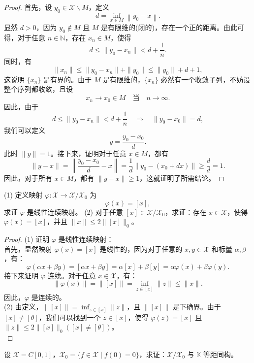 \documentclass[lang=cn,newtx,10pt,scheme=chinese,thmcnt=chapter]{elegantbook}
\begin{document}
\begin{proof}
首先，设 $y_0 \in \mathscr{X} \backslash M$，定义
\[
d =\inf_{x \in M} \left\| y_0 - x \right\|.
\]
显然 $d > 0$，因为 $y_0 \notin M$ 且 $M$ 是有限维的(闭的)，存在一个正的距离。由此可得，对于任意 $n \in \mathbb{N}$，存在 $x_n \in M$，使得
\[
d \leqslant \| y_0 - x_n \| < d + \frac{1}{n}.
\]
同时，有
\[
\| x_n \| \leqslant \| y_0 - x_n \| + \| y_0 \| \leqslant \| y_0 \| + d + 1,
\]
这说明 $\{x_n\}$ 是有界的。由于 $M$ 是有限维的，$\{x_n\}$ 必然有一个收敛子列，不妨设整个序列都收敛，且设
\[
x_n \to x_0 \in M \quad \text{当} \quad n \to \infty.
\]
因此，由于
\[
d \leqslant \| y_0 - x_n \| < d + \frac{1}{n} \quad \Rightarrow \quad \| y_0 - x_0 \| = d,
\]
我们可以定义
\[
y =\frac{y_0 - x_0}{d}.
\]
此时 $\| y \| = 1$。接下来，证明对于任意 $x \in M$，都有
\[
\| y - x \| = \left\| \frac{y_0 - x_0}{d} - x \right\| = \frac{1}{d} \| y_0 - (x_0 + d x) \| \geqslant \frac{d}{d} = 1.
\]
因此，对于所有 $x \in M$，都有 $\| y - x \| \geqslant 1$，这就证明了所需结论。
\end{proof}
\begin{example}
(1) 定义映射 $\varphi: \mathscr{X} \rightarrow \mathscr{X} / \mathscr{X}_0$ 为
\[
\varphi(x) = [x],
\]
求证 $\varphi$ 是线性连续映射。
(2) 对于任意 $[x] \in \mathscr{X} / \mathscr{X}_0$，求证：存在 $x \in \mathscr{X}$，使得 $\varphi(x) = [x]$，并且 $\|x\| \leqslant 2\|[x]\|_0$。
\end{example}

\begin{proof}
(1) 证明 $\varphi$ 是线性连续映射：\\
首先，显然映射 $\varphi(x) = [x]$ 是线性的，因为对于任意的 $x, y \in \mathscr{X}$ 和标量 $\alpha, \beta$，有：
\[
\varphi(\alpha x + \beta y) = [\alpha x + \beta y] = \alpha [x] + \beta [y] = \alpha \varphi(x) + \beta \varphi(y).
\]
接下来证明 $\varphi$ 连续。对于任意 $x \in \mathscr{X}$，有：
\[
\|\varphi(x)\| = \|[x]\| = \inf_{z \in [x]} \|z\| \leqslant \|x\|.
\]
因此，$\varphi$ 是连续的。\\
(2) 由定义，$\|[x]\| = \inf_{z \in [x]} \|z\|$，且 $\|[x]\|$ 是下确界。由于 $[x] \neq [\theta]$，我们可以找到一个 $z \in [x]$，使得 $\varphi(z) = [x]$ 且 $\|z\| \leqslant 2\|[x]\|_0([x]\neq[\theta])$。\\
\end{proof}
\begin{example}
设 $\mathscr{X} = C[0,1]$，$\mathscr{X}_0 = \{f \in \mathscr{X} \mid f(0) = 0\}$，求证：$\mathscr{X} / \mathscr{X}_0$ 与 $\mathbb{K}$ 等距同构。
\end{example}
\end{document}
